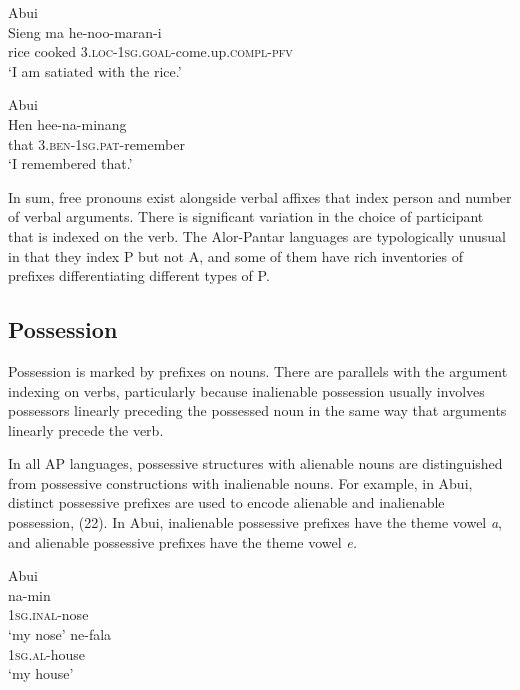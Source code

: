 \ea%
\label{ex:20}
Abui \citep[615]{Kratochvil2011}   \\
\gll Sieng   ma     he-noo-maran-i \\
rice   cooked   3.\textsc{loc}{}-1\textsc{sg}.\textsc{goal}{}-come.up.\textsc{compl-pfv}   \\
\glt `I am satiated with the rice.'
\z








\ea%
\label{ex:21}
Abui \citep[617]{Kratochvil2011}   \\
\gll Hen   hee-na-minang  \\
 that   3.\textsc{ben}{}-1\textsc{sg}.\textsc{pat}{}-remember  \\
\glt `I remembered that.'
\z

In sum, free pronouns exist alongside verbal affixes that index person and number of verbal arguments. There is significant variation in the choice of participant that is indexed on the verb. The Alor-Pantar languages are typologically unusual in that they index P but not A, and some of them have rich inventories of prefixes differentiating different types of P.

\subsection{Possession}
Possession is marked by prefixes on nouns. There are parallels with the argument indexing on verbs, particularly because inalienable possession usually involves possessors linearly preceding the possessed noun in the same way that arguments linearly precede the verb.

In all AP languages, possessive structures with alienable nouns are distinguished from possessive constructions with inalienable nouns. For example, in Abui, distinct possessive prefixes are used to encode alienable and inalienable possession, (22). In Abui, inalienable possessive prefixes have the theme vowel \textit{a}, and alienable possessive prefixes have the theme vowel \textit{e.}



\ea%
\label{ex:22}
Abui \citep{Kratochvil2007}    \\
\ea
\gll na-min \\
 1\textsc{sg.inal}{}-nose   \\
\glt `my nose'
\ex
\gll ne-fala \\
  \textsc{1sg.al}{}-house     \\
\glt  `my house'
\z
\z


